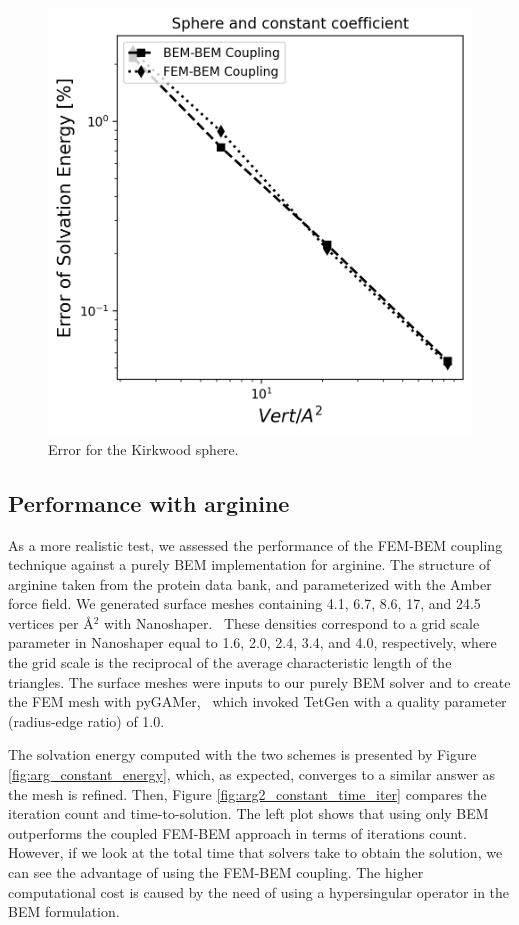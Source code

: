 \begin{figure}
  \centering
  \includegraphics[width=0.6\linewidth]{DolfinX_Sphere_const_coeff_error.png}
  \caption{Error for the Kirkwood sphere.}
  \label{fig:error_sphere}
\end{figure}

\subsection*{\sffamily \large Performance with arginine}

As a more realistic test, we assessed the performance of the FEM-BEM coupling technique against a purely BEM implementation for arginine.
The structure of arginine taken from the protein data bank, and parameterized with the Amber\cite{ponder2003force} force field. 
We generated surface meshes containing 4.1, 6.7, 8.6, 17, and 24.5 vertices per \AA$^2$ with Nanoshaper.~\cite{decherchi2013general}
These densities correspond to a grid scale parameter in Nanoshaper equal to 1.6, 2.0, 2.4, 3.4, and 4.0, respectively, where the grid scale is the reciprocal of the average characteristic length of the triangles.
The surface meshes were inputs to our purely BEM solver and to create the FEM mesh with pyGAMer,~\cite{lee2020open} which invoked TetGen\cite{hang2015tetgen} with a quality parameter (radius-edge ratio) of 1.0.

The solvation energy computed with the two schemes is presented by Figure \ref{fig:arg_constant_energy}, which, as expected, converges to a similar answer as the mesh is refined.
Then, Figure \ref{fig:arg2_constant_time_iter} compares the iteration count and time-to-solution. The left plot shows that using only BEM outperforms the coupled FEM-BEM approach in terms of iterations count. However, if we look at the total time that solvers take to obtain the solution, we can see the advantage of using the FEM-BEM coupling. The higher computational cost is caused by the need of using a hypersingular operator in the BEM formulation.


